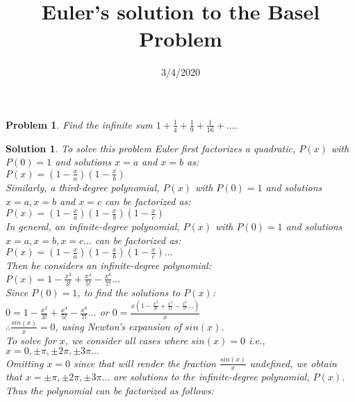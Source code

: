 \documentclass{article}
\title{Euler's solution to the Basel Problem}
\date{3/4/2020}
\newtheorem*{problem*}{Problem}
\newtheorem*{solution*}{Solution}
\begin{document}
\maketitle
 
\begin{problem*}
    Find the infinite sum
    $1+\frac{1}{4}+\frac{1}{9}+\frac{1}{16}+\dots$.
\end{problem*}

\begin{solution*}
    To solve this problem Euler first factorizes a quadratic, $P(x)$ 
    with $P(0)=1$ and solutions $x=a$ and $x=b$ as:\\
    
    $P(x)=(1-\frac{x}{a})(1-\frac{x}{b})$\\
    
    Similarly, a third-degree polynomial, $P(x)$ 
    with $P(0)=1$ and solutions $x=a,x=b$ and $x=c$ 
    can be factorized as:\\
    
    $P(x)=(1-\frac{x}{a})(1-\frac{x}{b})(1-\frac{x}{c})$\\

    In general, an infinite-degree polynomial, $P(x)$ 
    with $P(0)=1$ and solutions $x=a,x=b,x=c\dots$
    can be factorized as:\\
    
    $P(x)=(1-\frac{x}{a})(1-\frac{x}{b})(1-\frac{x}{c})\dots$\\

    Then he considers an infinite-degree polynomial:\\

    $P(x) = 1-\frac{x^2}{3!}+\frac{x^4}{5!}-\frac{x^6}{7!}\dots$\\
    
    Since $P(0)=1$, to find the solutions to $P(x)$:\\

    $0 = 1-\frac{x^2}{3!}+\frac{x^4}{5!}-\frac{x^6}{7!}\dots$
    or $0 = \frac{x(1-\frac{x^2}{3!}+\frac{x^4}{5!}-\frac{x^6}{7!}\dots)}{x}$\\
    
    $\therefore \frac{sin(x)}{x} = 0$, 
    using Newton's expansion of $sin(x)$.\\

    To solve for $x$, we consider all cases where $sin(x)=0$
    i.e., $x=0, \pm\pi, \pm2\pi, \pm3\pi\dots$\\

    Omitting $x=0$ since that will render the fraction 
    $\frac{sin(x)}{x}$ undefined, we obtain that $x=\pm\pi, \pm2\pi, \pm3\pi\dots$
    are solutions to the infinite-degree polynomial, $P(x)$. 
    Thus the polynomial can be factorized as follows:\\


\end{solution*}
\end{document}
